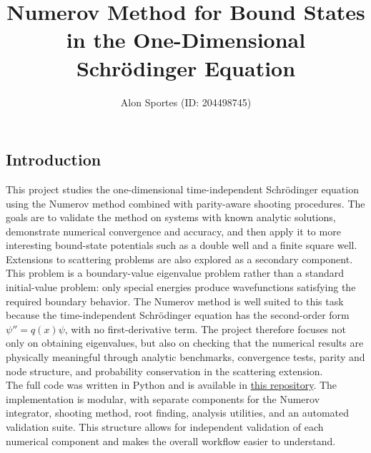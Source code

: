 \documentclass[11pt]{article}
\title{\textbf{Numerov Method for Bound States in the One-Dimensional Schr\"odinger Equation}}
\author{Alon Sportes (ID: 204498745)}
\date{}
\begin{document}
    \maketitle

    \vfill

    \begingroup
        \setlength{\parskip}{0pt}
        \tableofcontents
    \endgroup
    \vfill

    \begin{refsection}

    \newpage

    \section{Introduction}
        This project studies the one-dimensional time-independent Schr\"odinger equation using the Numerov method combined with parity-aware shooting procedures. The goals are to validate the method on systems with known analytic solutions, demonstrate numerical convergence and accuracy, and then apply it to more interesting bound-state potentials such as a double well and a finite square well. Extensions to scattering problems are also explored as a secondary component. \\

        This problem is a boundary-value eigenvalue problem rather than a standard initial-value problem: only special energies produce wavefunctions satisfying the required boundary behavior. The Numerov method is well suited to this task because the time-independent Schr\"odinger equation has the second-order form $\psi''=q(x)\psi$, with no first-derivative term. The project therefore focuses not only on obtaining eigenvalues, but also on checking that the numerical results are physically meaningful through analytic benchmarks, convergence tests, parity and node structure, and probability conservation in the scattering extension. \\
        
        The full code was written in Python and is available in \href{https://github.com/alons126/Numerov-bound-states}{this repository}. The implementation is modular, with separate components for the Numerov integrator, shooting method, root finding, analysis utilities, and an automated validation suite. This structure allows for independent validation of each numerical component and makes the overall workflow easier to understand.


\end{refsection}
\end{document}
